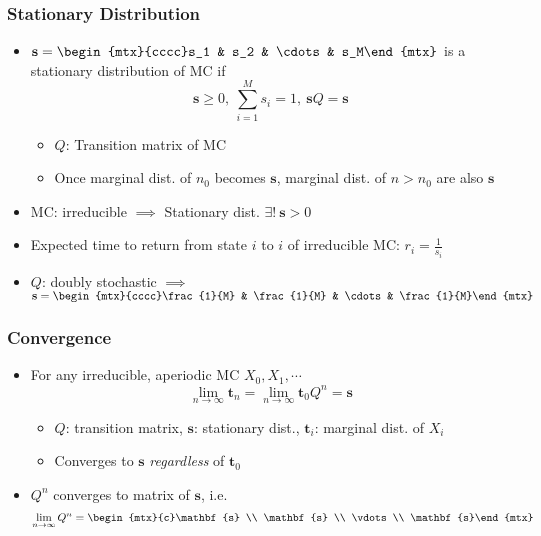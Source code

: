 \subsubsection*{Stationary Distribution}
\begin{itemize}
    \item $\mathbf{s}=\begin{mtx}{cccc}s_1 & s_2 & \cdots & s_M\end{mtx}$ is a stationary distribution of MC if
    \begin{equation}
        \mathbf{s}\geq 0,~\sum_{i=1}^Ms_i=1,~\mathbf{s}Q=\mathbf{s}
    \end{equation}
    \begin{itemize}
        \item $Q$: Transition matrix of MC
        \item Once marginal dist. of $n_0$ becomes $\mathbf{s}$, marginal dist. of $n>n_0$ are also $\mathbf{s}$
    \end{itemize}
    \item MC: irreducible $\implies$ Stationary dist. $\exists!~\textbf{s}>0$
    \item Expected time to return from state $i$ to $i$ of irreducible MC: $r_i=\frac{1}{s_i}$
    \item $Q$: doubly stochastic $\implies$ $\mathbf{s}=\begin{mtx}{cccc}\frac{1}{M} & \frac{1}{M} & \cdots & \frac{1}{M}\end{mtx}$
\end{itemize}

\subsubsection*{Convergence}
\begin{itemize}
    \item For any irreducible, aperiodic MC $X_0,X_1,\cdots$
    \begin{equation}
        \lim_{n\to\infty}\mathbf{t}_n=\lim_{n\to\infty}\mathbf{t}_0Q^n=\mathbf{s}
    \end{equation}
    \begin{itemize}
        \item $Q$: transition matrix, $\mathbf{s}$: stationary dist., $\mathbf{t}_i$: marginal dist. of $X_i$
        \item Converges to $\mathbf{s}$ \textit{regardless} of $\textbf{t}_0$
    \end{itemize}
    \item $Q^n$ converges to matrix of $\mathbf{s}$, i.e.
    \begin{equation}
        \lim_{n\to\infty}Q^n=\begin{mtx}{c}\mathbf{s} \\ \mathbf{s} \\ \vdots \\ \mathbf{s}\end{mtx}
    \end{equation}
\end{itemize}

